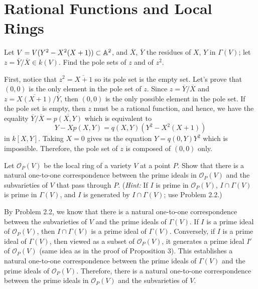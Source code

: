 \section{Rational Functions and Local Rings}

\begin{exercise}
    Let $V = V(Y^2 - X^2(X+1)) \subset \mathbb{A}^2$, and $\overline{X}$, $\overline{Y}$ the residues of $X$, $Y$ in $\Gamma(V)$; let $z = \overline{Y}/\overline{X} \in k(V)$. Find the pole sets of $z$ and of $z^2$. \\
\end{exercise}

\begin{solution}
    First, notice that $z^2 = \overline{X+1}$ so its pole set is the empty set. Let's prove that $(0,0)$ is the only element in the pole set of $z$. Since $z = \overline{Y}/\overline{X}$ and $z = \overline{X(X+1)}/\overline{Y}$, then $(0,0)$ is the only possible element in the pole set. If the pole set is empty, then $z$ must be a rational function, and hence, we have the equality $\overline{Y}/\overline{X} = \overline{p(X,Y)}$ which is equivalent to
    $$Y - Xp(X,Y) = q(X,Y)(Y^2 - X^2(X+1))$$
    in $k[X,Y]$. Taking $X=0$ gives us the equation $Y = q(0,Y)Y^2$ which is impossible. Therefore, the pole set of $z$ is composed of $(0,0)$ only.\\
\end{solution}

\begin{exercise}
    Let $\mathcal{O}_P(V)$ be the local ring of a variety $V$ at a point $P$. Show that there is a natural one-to-one correspondence between the prime ideals in $\mathcal{O}_P(V)$ and the subvarieties of $V$ that pass through $P$. (\textit{Hint:} If $I$ is prime in $\mathcal{O}_P(V)$, $I\cap \Gamma(V)$ is prime in $\Gamma(V)$, and $I$ is generated by $I\cap \Gamma(V)$; use Problem 2.2.)\\
\end{exercise}

\begin{solution}
    By Problem 2.2, we know that there is a natural one-to-one correspondence between the subvarieties of $V$ and the prime ideals of $\Gamma(V)$. If $I$ is a prime ideal of $\mathcal{O}_P(V)$, then $I \cap \Gamma(V)$ is a prime ideal of $\Gamma(V)$. Conversely, if $I$ is a prime ideal of $\Gamma(V)$, then viewed as a subset of $\mathcal{O}_P(V)$, it generates a prime ideal $I'$ of $\mathcal{O}_P(V)$ (same idea as in the proof of Proposition 3). This establishes a natural one-to-one correspondence between the prime ideals of $\Gamma(V)$ and the prime ideals of $\mathcal{O}_P(V)$. Therefore,  there is a natural one-to-one correspondence between the prime ideals in $\mathcal{O}_P(V)$ and the subvarieties of $V$. \\
\end{solution}

